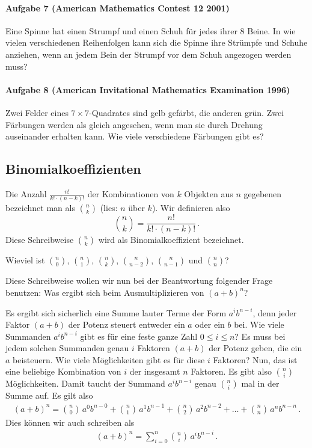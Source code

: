 \documentclass[11pt,a4paper]{article}
\begin{document}
\paragraph{Aufgabe 7 (American Mathematics Contest 12 2001)} 
Eine Spinne hat einen Strumpf und einen Schuh für jedes ihrer 8 Beine. In wie
vielen verschiedenen Reihenfolgen kann sich die Spinne ihre Strümpfe und
Schuhe anziehen, wenn an jedem Bein der Strumpf vor dem Schuh angezogen werden
muss?

\paragraph{Aufgabe 8 (American Invitational Mathematics Examination 1996)} 
Zwei Felder eines $7\times 7$-Quadrates sind gelb gefärbt, die anderen grün.
Zwei Färbungen werden als gleich angesehen, wenn man sie durch Drehung
auseinander erhalten kann. Wie viele verschiedene Färbungen gibt es?

\subsection*{Binomialkoeffizienten}
Die Anzahl $\frac{n!}{k!\cdot (n-k)!}$ der Kombinationen von $k$ Objekten aus
$n$ gegebenen bezeichnet man als $\binom{n}{k}$ (lies: $n$ über $k$). Wir
definieren also
\[\binom{n}{k}=\frac{n!}{k!\cdot (n-k)!}\,.\]
Diese Schreibweise $\binom{n}{k}$ wird als Binomialkoeffizient bezeichnet.

Wieviel ist $\binom{n}{0}$, $\binom{n}{1}$, $\binom{n}{k}$,
$\binom{n}{n-2}$, $\binom{n}{n-1}$ und $\binom{n}{n}$?

Diese Schreibweise wollen wir nun bei der Beantwortung folgender Frage
benutzen: Was ergibt sich beim Ausmultiplizieren von $(a+b)^{n}$?

Es ergibt sich sicherlich eine Summe lauter Terme der Form $a^{i}b^{n-i}$,
denn jeder Faktor $(a+b)$ der Potenz steuert entweder ein $a$ oder ein $b$
bei.  Wie viele Summanden $a^{i}b^{n-i}$ gibt es für eine feste ganze Zahl
$0\leq i\leq n$? Es muss bei jedem solchen Summanden genau $i$ Faktoren
$(a+b)$ der Potenz geben, die ein $a$ beisteuern. Wie viele Möglichkeiten gibt
es für diese $i$ Faktoren? Nun, das ist eine beliebige Kombination von $i$ der
insgesamt $n$ Faktoren. Es gibt also $\binom{n}{i}$ Möglichkeiten. Damit
taucht der Summand $a^{i}b^{n-i}$ genau $\binom{n}{i}$ mal in der Summe
auf. Es gilt
also 
\begin{gather*}
  (a+b)^{n}=\binom{n}{0}\,a^{0}b^{n-0} +\binom{n}{1}\,a^{1}b^{n-1}
  +\binom{n}{2}\,a^{2}b^{n-2}+\dots +\binom{n}{n}\,a^{n}b^{n-n}\,.
\end{gather*}
Dies können wir auch schreiben als
\begin{gather*}
  (a+b)^{n}=\sum_{i=0}^{n} \binom{n}{i}\,a^{i}b^{n-i}\,.
\end{gather*}
\end{document}
